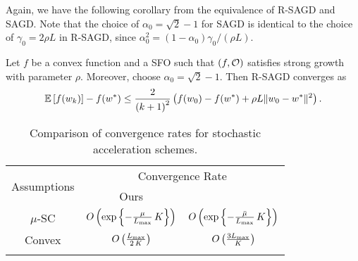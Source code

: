 Again, we have the following corollary from the equivalence of R-SAGD and SAGD. 
Note that the choice of \( \alpha_0 = \sqrt{2} - 1 \) for SAGD is identical to the choice of \( \gamma_0 = 2 \rho L \) in R-SAGD, since \( \alpha_0^2 = (1 - \alpha_0) \gamma_0 / (\rho L) \).

\begin{corollary}
    Let \( f \) be a convex function and \oracle{} a SFO such that \( \rbr{f, \oracle{}} \) satisfies strong growth with parameter \( \rho \).
    Moreover, choose \( \alpha_0 = \sqrt{2} - 1 \).
    Then R-SAGD converges as  
    \[ \E\sbr{f(\wk)} - f(\wopt) \leq \frac{2}{\rbr{k+1}^2}\rbr{f(\w_0) - f(\wopt) + \rho L \norm{\w_0 - \wopt}^2 }. \]
\end{corollary}

\newpage

\begin{table}[t]
    \centering
    \begin{tabular}{c c c  }\toprule
        \multirow{2}{*}{Assumptions} & \multicolumn{2}{c}{Convergence Rate}\\%
        \cmidrule(lr){2-3} 
                 & \multicolumn{1}{c}{Ours} & \multicolumn{1}{c}{\citet{vaswani2019painless}}\\ \midrule
        \( \mu \)-SC & \( O\rbr{\exp\cbr{- \frac{\mu}{\Lmax} \, K}} \)%
                     & \( O\rbr{\exp\cbr{- \frac{\bar \mu}{\Lmax} \, K}} \) \\ \addlinespace
    Convex       & \( O\rbr{\frac{\Lmax}{2 \, K}} \)%
                 & \( O\rbr{\frac{3 \Lmax}{K}} \)\\ \addlinespace 
        \end{tabular}
        \caption{Comparison of convergence rates for stochastic acceleration schemes.}%
    \label{table:ls-comparison}
\end{table}


